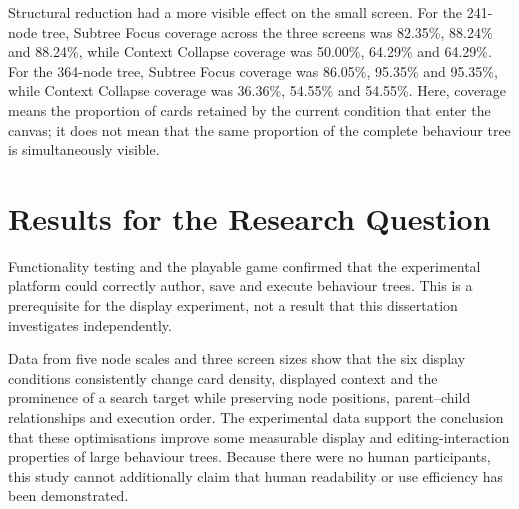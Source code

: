 Structural reduction had a more visible effect on the small screen. For the 241-node tree, Subtree Focus coverage across the three screens was 82.35\%, 88.24\% and 88.24\%, while Context Collapse coverage was 50.00\%, 64.29\% and 64.29\%. For the 364-node tree, Subtree Focus coverage was 86.05\%, 95.35\% and 95.35\%, while Context Collapse coverage was 36.36\%, 54.55\% and 54.55\%. Here, coverage means the proportion of cards retained by the current condition that enter the canvas; it does not mean that the same proportion of the complete behaviour tree is simultaneously visible.

\section{Results for the Research Question}

Functionality testing and the playable game confirmed that the experimental platform could correctly author, save and execute behaviour trees. This is a prerequisite for the display experiment, not a result that this dissertation investigates independently.

Data from five node scales and three screen sizes show that the six display conditions consistently change card density, displayed context and the prominence of a search target while preserving node positions, parent--child relationships and execution order. The experimental data support the conclusion that these optimisations improve some measurable display and editing-interaction properties of large behaviour trees. Because there were no human participants, this study cannot additionally claim that human readability or use efficiency has been demonstrated.
